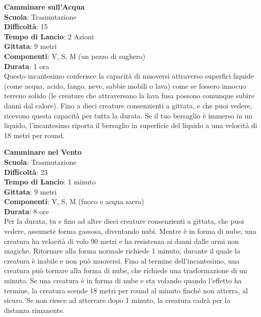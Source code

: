 \begin{multicols}{2}
\medskip\textbf{Camminare sull'Acqua}\\
\textbf{Scuola}: Trasmutazione\\
\textbf{Difficoltà}:  15\\
\textbf{Tempo di Lancio}: 2 Azioni\\
\textbf{Gittata}: 9 metri\\
\textbf{Componenti}: V, S, M (un pezzo di sughero)\\
\textbf{Durata}: 1 ora\\
Questo incantesimo conferisce la capacità di muoversi attraverso superfici liquide (come acqua, acido, fango, neve, sabbie mobili o lava) come se fossero innocuo terreno solido (le creature che attraversano la lava fusa possono comunque subire danni dal calore). Fino a dieci creature consenzienti a gittata, e che puoi vedere, ricevono questa capacità per tutta la durata. Se il tuo bersaglio è immerso in un liquido, l'incantesimo riporta il bersaglio in superficie del liquido a una velocità di 18 metri per round. 

\medskip\textbf{Camminare nel Vento}\\
\textbf{Scuola}: Trasmutazione\\
\textbf{Difficoltà}:  23\\
\textbf{Tempo di Lancio}: 1 minuto\\
\textbf{Gittata}: 9 metri\\
\textbf{Componenti}: V, S, M (fuoco e acqua sacra)\\
\textbf{Durata}: 8 ore\\
Per la durata, tu e fino ad altre dieci creature consenzienti a gittata, che puoi vedere, assumete forma gassosa, diventando nubi. Mentre è in forma di nube, una creatura ha velocità di volo 90 metri e ha resistenza ai danni dalle armi non magiche. Ritornare alla forma normale richiede 1 minuto, durante il quale la creatura è inabile e non può muoversi. Fino al termine dell'incantesimo, una creatura può tornare alla forma di nube, che richiede una trasformazione di un minuto. Se una creatura è in forma di nube e sta volando quando l’effetto ha termine, la creatura scende 18 metri per round al minuto finché non atterra, al sicuro. Se non riesce ad atterrare dopo 1 minuto, la creatura cadrà per la distanza rimanente.


\end{multicols}
